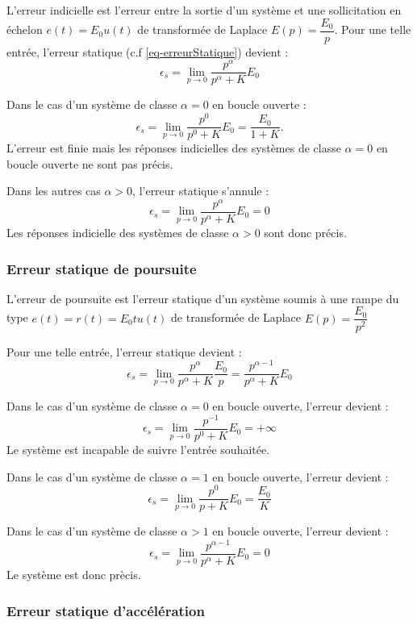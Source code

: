 L'erreur indicielle est l'erreur entre la sortie d'un système et une 
sollicitation en échelon $e(t)=E_0u(t)$ de transformée de Laplace 
$E(p)=\dfrac{E_0}{p}$. 
Pour une telle entrée, l'erreur statique (c.f \cref{eq-erreurStatique}) 
devient :
$$
\epsilon_s=\lim\limits_{p\to 0} \dfrac{p^\alpha}{p^\alpha+K}E_0
$$

Dans le cas d'un système de classe $\alpha=0$ en boucle ouverte :
$$
\epsilon_s=\lim\limits_{p\to 0} \dfrac{p^0}{p^0+K}E_0=\dfrac{E_0}{1+K}.
$$
L'erreur est finie mais les réponses indicielles des systèmes de classe 
$\alpha=0$ en boucle ouverte ne sont pas précis.

Dans les autres cas $\alpha>0$, l'erreur statique s'annule :
$$
\epsilon_s=\lim\limits_{p\to 0} \dfrac{p^\alpha}{p^\alpha+K}E_0=0
$$
Les réponses indicielle des systèmes de classe $\alpha>0$ sont donc précis.

\subsubsection{Erreur statique de poursuite}
L'erreur de poursuite est l'erreur statique d'un système soumis à une rampe 
du type $e(t)=r(t)=E_0t u(t)$
de transformée de Laplace $E(p)=\dfrac{E_0}{p^2}$

Pour une telle entrée, l'erreur statique devient :
$$
\epsilon_s=\lim\limits_{p\to 0} \dfrac{p^\alpha}{p^\alpha+K}\dfrac{E_0}{p}
          =\dfrac{p^{\alpha-1}}{p^\alpha+K}E_0 
$$

Dans le cas d'un système de classe $\alpha=0$ en boucle ouverte, 
l'erreur devient :
$$
\epsilon_s=\lim\limits_{p\to 0}\dfrac{p^{-1}}{p^0+K}E_0=+\infty
$$
Le système est incapable de suivre l'entrée souhaitée.

Dans le cas d'un système de classe $\alpha=1$ en boucle ouverte, 
l'erreur devient :
$$
\epsilon_s=\lim\limits_{p\to 0}\dfrac{p^0}{p+K}E_0=\dfrac{E_0}{K}
$$

Dans le cas d'un système de classe $\alpha>1$ en boucle ouverte, 
l'erreur devient :
$$
\epsilon_s=\lim\limits_{p\to 0}\dfrac{p^{\alpha-1}}{p^\alpha+K}E_0=0
$$
Le système est donc prècis.

\subsubsection{Erreur statique d'accélération}

